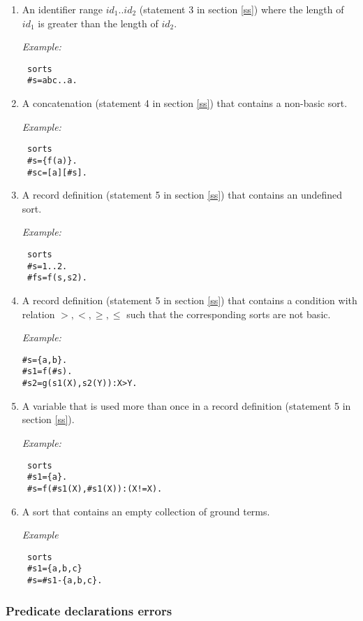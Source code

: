 \documentclass[12pt, letterpaper]{article}
\begin{document}
\begin{enumerate}
\item An identifier range $id_1..id_2$ (statement 3 in section \ref{ss}) where  the length of $id_1$ is greater than the length of $id_2$. 


\textit{Example:}
\begin{verbatim}
 sorts
 #s=abc..a.
\end{verbatim}

\item A concatenation (statement  4 in section \ref{ss}) that contains a non-basic sort.

\textit{Example:}
\begin{verbatim}
 sorts
 #s={f(a)}.
 #sc=[a][#s].
\end{verbatim}



\item A record definition (statement 5 in section \ref{ss}) that contains an undefined sort.

\textit{Example:}
\begin{verbatim}
 sorts
 #s=1..2.
 #fs=f(s,s2).
\end{verbatim}



\item A record definition  (statement 5 in section \ref{ss}) that contains a condition with relation $>,<,\geq,\leq$ such that the
   corresponding sorts are not basic.

\textit{Example:}
\begin{verbatim}
#s={a,b}.
#s1=f(#s). 
#s2=g(s1(X),s2(Y)):X>Y.
\end{verbatim}

\item  A variable that is used more than once in a record definition (statement  5 in section \ref{ss}).

\textit{Example:}

\begin{verbatim}
 sorts
 #s1={a}.
 #s=f(#s1(X),#s1(X)):(X!=X).
\end{verbatim}
\item A sort that contains an empty collection of ground terms.

\textit{Example}
\begin{verbatim}
 sorts
 #s1={a,b,c}
 #s=#s1-{a,b,c}.
\end{verbatim}
\end{enumerate}
\subsubsection{Predicate declarations errors}
\end{document}
